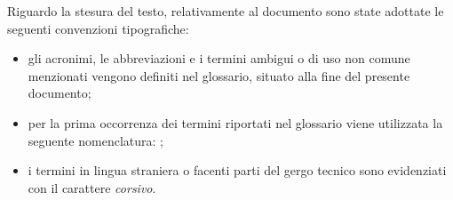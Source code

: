 \noindent Riguardo la stesura del testo, relativamente al documento sono state adottate le seguenti convenzioni tipografiche:
\begin{itemize}
	\item gli acronimi, le abbreviazioni e i termini ambigui o di uso non comune menzionati vengono definiti nel glossario, situato alla fine del presente documento;
	\item per la prima occorrenza dei termini riportati nel glossario viene utilizzata la seguente nomenclatura: ;
	\item i termini in lingua straniera o facenti parti del gergo tecnico sono evidenziati con il carattere \emph{corsivo}.
\end{itemize}